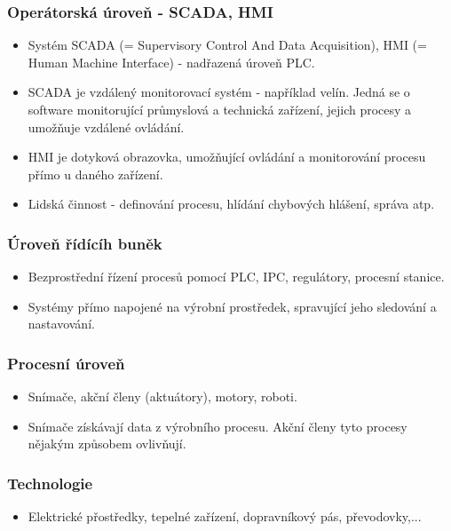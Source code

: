 \subsubsection*{Operátorská úroveň - SCADA, HMI}
\begin{itemize}
    \item Systém SCADA (= Supervisory Control And Data Acquisition), HMI (= Human Machine Interface) - nadřazená úroveň PLC.
    \item SCADA je vzdálený monitorovací systém - například velín. Jedná se o software monitorující průmyslová a technická zařízení, jejich procesy a umožňuje vzdálené ovládání.
    \item HMI je dotyková obrazovka, umožňující ovládání a monitorování procesu přímo u daného zařízení.
    \item Lidská činnost - definování procesu, hlídání chybových hlášení, správa atp.
\end{itemize}

\subsubsection*{Úroveň řídícíh buněk}
\begin{itemize}
    \item Bezprostřední řízení procesů pomocí PLC, IPC, regulátory, procesní stanice.
    \item Systémy přímo napojené na výrobní prostředek, spravující jeho sledování a nastavování.
\end{itemize}

\subsubsection*{Procesní úroveň}
\begin{itemize}
    \item Snímače, akční členy (aktuátory), motory, roboti.
    \item Snímače získávají data z výrobního procesu. Akční členy tyto procesy nějakým způsobem ovlivňují.
\end{itemize}

\subsubsection*{Technologie}
\begin{itemize}
    \item Elektrické přostředky, tepelné zařízení, dopravníkový pás, převodovky,...
\end{itemize}

